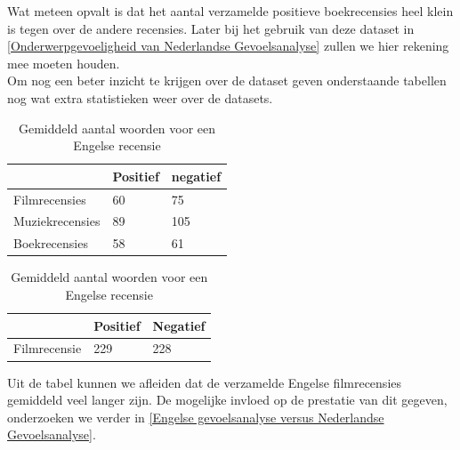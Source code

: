 Wat meteen opvalt is dat het aantal verzamelde positieve boekrecensies heel klein is tegen over de andere recensies. Later bij het gebruik van deze dataset in \ref{Onderwerpgevoeligheid van Nederlandse Gevoelsanalyse} zullen we hier rekening mee moeten houden.\\

Om nog een beter inzicht te krijgen over de dataset geven onderstaande tabellen nog wat extra statistieken weer over de datasets.\\

\begin{table}[h]
\centering
\setlength\tabcolsep{2pt}
\begin{minipage}[t]{0.48\textwidth}
\centering

\begin{tabular}{l|l|l|}
\cline{2-3}
                & Positief & negatief \\ \hline
\multicolumn{1}{|l|}{Filmrecensies}   & 60       & 75       \\ \hline
\multicolumn{1}{|l|}{Muziekrecensies} & 89       & 105      \\ \hline
\multicolumn{1}{|l|}{Boekrecensies}   & 58       & 61    \\ \hline   
\end{tabular}

\caption{Gemiddeld aantal woorden voor een Nederlandse recensie} 
\label{tabel: Gemiddeld aantal woorden per recensie Nederlands}
\end{minipage}%
\hfill
\begin{minipage}[t]{0.48\textwidth}
\centering

\begin{tabular}{l|l|l|}
\cline{2-3}
                                   & Positief & Negatief \\ \hline
\multicolumn{1}{|l|}{Filmrecensie} & 229      & 228      \\ \hline
\end{tabular}
\caption{Gemiddeld aantal woorden voor een Engelse recensie}
\label{tabel: Gemiddeld aantal woorden per recensie Engels}
\end{minipage}
\end{table} 

Uit de tabel kunnen we afleiden dat de verzamelde Engelse filmrecensies gemiddeld veel langer zijn. De mogelijke invloed op de prestatie van dit gegeven, onderzoeken we verder in \ref{Engelse gevoelsanalyse versus Nederlandse Gevoelsanalyse}.

